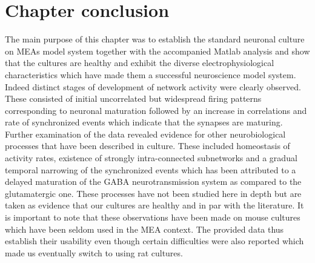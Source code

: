     \section{Chapter conclusion}
    The main purpose of this chapter was to establish the standard neuronal culture on MEAs model system together with the accompanied Matlab analysis and show that the cultures are healthy and exhibit the diverse electrophysiological characteristics which have made them a successful neuroscience model system. Indeed distinct stages of development of network activity were clearly observed. These consisted of initial uncorrelated but widespread firing patterns corresponding to neuronal maturation followed by an increase in correlations and rate of synchronized events which indicate that the synapses are maturing. Further examination of the data revealed evidence for other neurobiological processes that have been described in culture. These included homeostasis of activity rates, existence of strongly intra-connected subnetworks and a gradual temporal narrowing of the synchronized events which has been attributed to a delayed maturation of the GABA neurotransmission system as compared to the glutamatergic one. These processes have not been studied here in depth but are taken as evidence that our cultures are healthy and in par with the literature. It is important to note that these observations have been made on mouse cultures which have been seldom used in the MEA context. The provided data thus establish their usability even though certain difficulties were also reported which made us eventually switch to using rat cultures.

